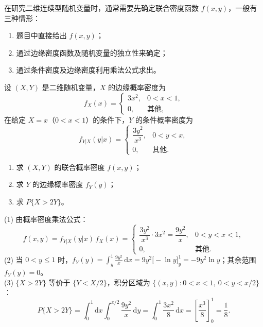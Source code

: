 \documentclass[lang=cn,11pt]{elegantbook}
\begin{document}
\begin{note}
在研究二维连续型随机变量时，通常需要先确定联合密度函数 $f(x,y)$，一般有三种情形：
\begin{enumerate}
    \item 题目中直接给出 $f(x,y)$；
    \item 通过边缘密度函数及随机变量的独立性来确定；
    \item 通过条件密度及边缘密度利用乘法公式求出。
\end{enumerate}
\end{note}

\begin{exercise}\label{exer:3-4}
设 $(X,Y)$ 是二维随机变量，$X$ 的边缘概率密度为
\[
f_X(x) = \begin{cases} 3x^2, & 0 < x < 1, \\ 0, & \text{其他}, \end{cases}
\]
在给定 $X = x$（$0 < x < 1$）的条件下，$Y$ 的条件概率密度为
\[
f_{Y|X}(y|x) = \begin{cases} \dfrac{3y^2}{x^3}, & 0 < y < x, \\ 0, & \text{其他}. \end{cases}
\]
\begin{enumerate}
    \item[(1)] 求 $(X,Y)$ 的联合概率密度 $f(x,y)$；
    \item[(2)] 求 $Y$ 的边缘概率密度 $f_Y(y)$；
    \item[(3)] 求 $P\{X > 2Y\}$。
\end{enumerate}
\end{exercise}
\begin{solution}
(1) 由概率密度乘法公式：
\[
f(x,y) = f_{Y|X}(y|x)\,f_X(x) = \begin{cases} \dfrac{3y^2}{x^3} \cdot 3x^2 = \dfrac{9y^2}{x}, & 0 < y < x < 1, \\ 0, & \text{其他}. \end{cases}
\]
(2) 当 $0 < y \leqslant 1$ 时，$f_Y(y) = \displaystyle\int_y^1 \frac{9y^2}{x}\,\mathrm{d}x = 9y^2\bigl[-\ln y\bigr]_y^1 = -9y^2\ln y$；其余范围 $f_Y(y) = 0$。\\
(3) $\{X > 2Y\}$ 等价于 $\{Y < X/2\}$，积分区域为 $\{(x,y): 0 < x < 1,\ 0 < y < x/2\}$：
\[
P\{X > 2Y\} = \int_0^1\mathrm{d}x\int_0^{x/2}\frac{9y^2}{x}\,\mathrm{d}y = \int_0^1 \frac{3x^2}{8}\,\mathrm{d}x = \left[\frac{x^3}{8}\right]_0^1 = \frac{1}{8}.
\]
\end{solution}
\end{document}
